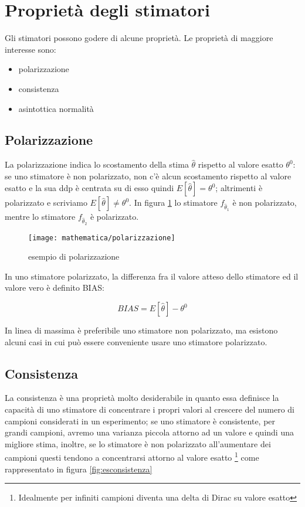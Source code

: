 \section{Proprietà degli stimatori}
Gli stimatori possono godere di alcune proprietà. Le proprietà di maggiore interesse sono:
  \begin{itemize}
     \item polarizzazione
     \item consistenza
     \item asintottica normalità
   \end{itemize}
\subsection{Polarizzazione}
La polarizzazione  indica lo scostamento della stima $\hat{\theta}$ rispetto al valore esatto $\theta^0$: se uno stimatore è non polarizzato, non c'è alcun scostamento rispetto al valore esatto e la sua ddp è centrata su di esso quindi $E[\hat{\theta}]=\theta^0$; altrimenti è polarizzato e scriviamo $E[\hat{\theta}]\ne \theta^0$. In figura \ref{fig:espolarizzazione} lo stimatore $f_{\hat{\theta}_1}$ è non polarizzato, mentre lo stimatore $f_{\hat{\theta}_2}$ è polarizzato. 

  \begin{figure}[htbp]
    \centering
    \texttt{[image: mathematica/polarizzazione]}
    \caption{esempio di polarizzazione\label{fig:espolarizzazione}}
  \end{figure}

In uno stimatore polarizzato, la differenza fra il valore atteso dello stimatore ed il valore vero è definito BIAS:

    \[ BIAS=E[\hat{\theta}]-\theta^0 \]

In linea di massima è preferibile uno stimatore non polarizzato, ma esistono alcuni casi in cui può essere conveniente usare uno stimatore polarizzato. 


\subsection{Consistenza}
La consistenza  è una proprietà molto desiderabile in quanto essa definisce la capacità di uno stimatore di concentrare i propri valori al crescere del numero di campioni considerati in un esperimento; se uno stimatore è consistente, per grandi campioni, avremo una varianza piccola attorno ad un valore e quindi una migliore stima, inoltre, se lo stimatore è non polarizzato all'aumentare dei campioni questi tendono a concentrarsi attorno al valore esatto \footnote{Idealmente per infiniti campioni diventa una delta di Dirac su valore esatto} come rappresentato in figura \ref{fig:esconsistenza}

